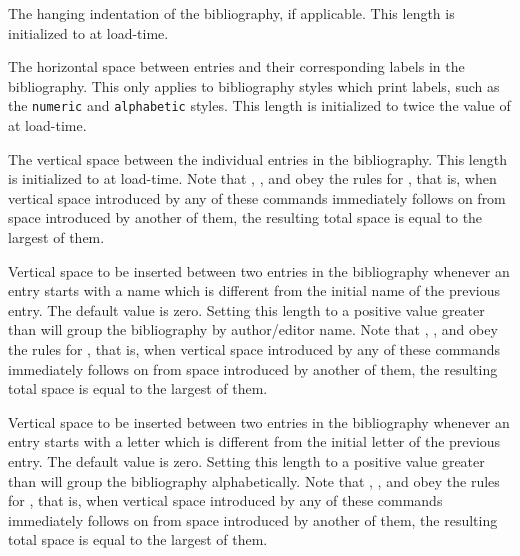 \begin{ltxsyntax}


The hanging indentation of the bibliography, if applicable. This length is initialized to  at load-time.


The horizontal space between entries and their corresponding labels in the bibliography. This only applies to bibliography styles which print labels, such as the \texttt{numeric} and \texttt{alphabetic} styles. This length is initialized to twice the value of  at load-time.


The vertical space between the individual entries in the bibliography. This length is initialized to  at load-time. Note that , , and  obey the rules for , that is, when vertical space introduced by any of these commands immediately follows on from space introduced by another of them, the resulting total space is equal to the largest of them.


Vertical space to be inserted between two entries in the bibliography whenever an entry starts with a name which is different from the initial name of the previous entry. The default value is zero. Setting this length to a positive value greater than  will group the bibliography by author\slash editor name. Note that , , and  obey the rules for , that is, when vertical space introduced by any of these commands immediately follows on from space introduced by another of them, the resulting total space is equal to the largest of them.


Vertical space to be inserted between two entries in the bibliography whenever an entry starts with a letter which is different from the initial letter of the previous entry. The default value is zero. Setting this length to a positive value greater than  will group the bibliography alphabetically. Note that , , and  obey the rules for , that is, when vertical space introduced by any of these commands immediately follows on from space introduced by another of them, the resulting total space is equal to the largest of them.


\end{ltxsyntax}
